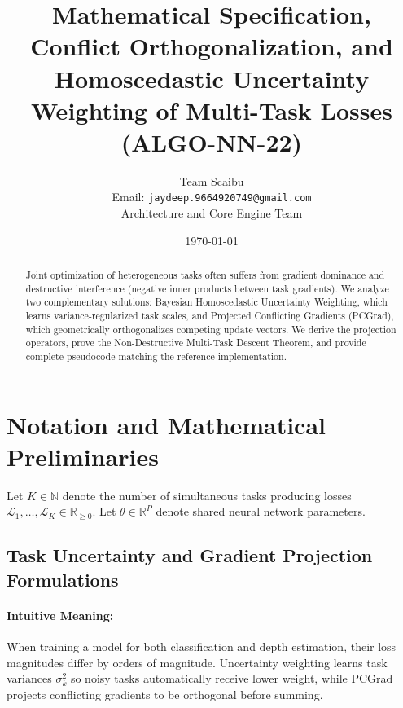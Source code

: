 \documentclass[11pt]{article}
\title{\textbf{Mathematical Specification, Conflict Orthogonalization, and Homoscedastic Uncertainty Weighting of Multi-Task Losses (ALGO-NN-22)}}
\author{Team Scaibu \\ \small Email: \texttt{jaydeep.9664920749@gmail.com} \\ \small Architecture and Core Engine Team}
\date{\today}
\begin{document}
\maketitle

\begin{abstract}
Joint optimization of heterogeneous tasks often suffers from gradient dominance and destructive interference (negative inner products between task gradients). We analyze two complementary solutions: Bayesian Homoscedastic Uncertainty Weighting, which learns variance-regularized task scales, and Projected Conflicting Gradients (PCGrad), which geometrically orthogonalizes competing update vectors. We derive the projection operators, prove the Non-Destructive Multi-Task Descent Theorem, and provide complete pseudocode matching the reference implementation.
\end{abstract}

\section{Notation and Mathematical Preliminaries}
\label{sec:notation}

Let $K \in \mathbb{N}$ denote the number of simultaneous tasks producing losses $\mathcal{L}_1, \dots, \mathcal{L}_K \in \mathbb{R}_{\ge 0}$. Let $\theta \in \mathbb{R}^P$ denote shared neural network parameters.

\subsection{Task Uncertainty and Gradient Projection Formulations}
\paragraph{Intuitive Meaning:} When training a model for both classification and depth estimation, their loss magnitudes differ by orders of magnitude. Uncertainty weighting learns task variances $\sigma_k^2$ so noisy tasks automatically receive lower weight, while PCGrad projects conflicting gradients to be orthogonal before summing.
\end{document}
